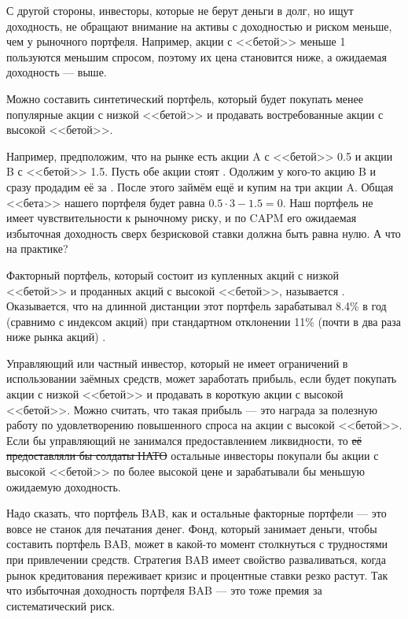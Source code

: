 С другой стороны, инвесторы, которые не берут деньги в долг, но ищут 
доходность, не обращают внимание на активы с доходностью и риском меньше, чем у 
рыночного портфеля. Например, акции с <<бетой>> меньше 1 пользуются меньшим 
спросом, поэтому их цена становится ниже, а ожидаемая доходность --- выше.

Можно составить синтетический портфель, который будет покупать менее популярные 
акции с низкой <<бетой>> и продавать востребованные акции с высокой <<бетой>>. 

Например, предположим, что на рынке есть акции A с <<бетой>> 0.5 и акции B с 
<<бетой>> 1.5. Пусть обе акции стоят . Одолжим у кого-то акцию B 
и сразу продадим её за . После этого займём ещё  и 
купим на  три акции A. Общая <<бета>> нашего портфеля будет равна 
$0.5 \cdot 3 - 1.5 = 0$. Наш портфель не имеет чувствительности к рыночному 
риску, и по CAPM его ожидаемая избыточная доходность сверх безрисковой ставки 
должна быть равна нулю. А что на практике?

Факторный портфель, который состоит из купленных акций с низкой <<бетой>> и
проданных акций с высокой <<бетой>>, называется . Оказывается, что на длинной дистанции этот портфель 
зарабатывал 8.4\% в год (сравнимо с индексом акций) при стандартном отклонении 
11\% (почти в два раза ниже рынка акций) \cite{frazzini2014betting}.

Управляющий или частный инвестор, который не имеет ограничений в использовании 
заёмных средств, может заработать прибыль, если будет покупать акции с низкой 
<<бетой>> и продавать в короткую акции с высокой <<бетой>>. Можно считать, что 
такая прибыль --- это награда за полезную работу по удовлетворению повышенного 
спроса на акции с высокой <<бетой>>. Если бы управляющий не занимался 
предоставлением ликвидности, то \sout{её предоставляли бы солдаты НАТО} 
остальные инвесторы покупали бы акции с высокой <<бетой>> по более высокой цене 
и зарабатывали бы меньшую ожидаемую доходность.

Надо сказать, что портфель BAB, как и остальные факторные портфели --- это вовсе 
не станок для печатания денег. Фонд, который занимает деньги, чтобы составить 
портфель BAB, может в какой-то момент столкнуться с трудностями при привлечении
средств. Стратегия BAB имеет свойство разваливаться, когда рынок кредитования
переживает кризис и процентные ставки резко растут. Так что избыточная 
доходность портфеля BAB --- это тоже премия за систематический риск.

